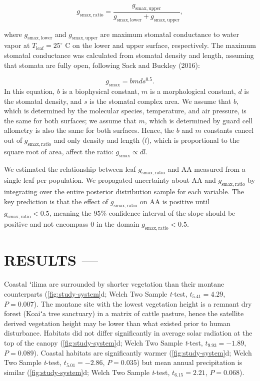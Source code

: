 \documentclass[
  letterpaper,
  DIV=11,
  numbers=noendperiod]{scrartcl}
\begin{document}
\[g_\mathrm{smax,ratio} = \frac{g_\mathrm{smax,upper}}{g_\mathrm{smax,lower} + g_\mathrm{smax,upper}},\]

where \(g_\mathrm{smax,lower}\) and \(g_\mathrm{smax,upper}\) are
maximum stomatal conductance to water vapor at
\(T_\mathrm{leaf} = 25 ^ \circ\) C on the lower and upper surface,
respectively. The maximum stomatal conductance was calculated from
stomatal density and length, assuming that stomata are fully open,
following Sack and Buckley (2016):

\[g_\mathrm{smax} = bmds^{0.5}.\] In this equation, \(b\) is a
biophysical constant, \(m\) is a morphological constant, \(d\) is the
stomatal density, and \(s\) is the stomatal complex area. We assume that
\(b\), which is determined by the molecular species, temperature, and
air pressure, is the same for both surfaces; we assume that \(m\), which
is determined by guard cell allometry is also the same for both
surfaces. Hence, the \(b\) and \(m\) constants cancel out of
\(g_\mathrm{smax,ratio}\) and only density and length (\(l\)), which is
proportional to the square root of area, affect the ratio:
\(g_\mathrm{smax} \propto dl\).

We estimated the relationship between leaf \(g_\mathrm{smax,ratio}\) and
\(\mathrm{AA}\) measured from a single leaf per population. We
propagated uncertainty about \(\mathrm{AA}\) and
\(g_\mathrm{smax,ratio}\) by integrating over the entire posterior
distribution sample for each variable. The key prediction is that the
effect of \(g_\mathrm{smax,ratio}\) on \(\mathrm{AA}\) is positive until
\(g_\mathrm{smax,ratio} < 0.5\), meaning the 95\% confidence interval of
the slope should be positive and not encompass 0 in the domain
\(g_\mathrm{smax,ratio} < 0.5\).

\hypertarget{results}{%
\section{RESULTS ---}\label{results}}

Coastal ʻilima are surrounded by shorter vegetation than their montane
counterparts (\autoref{fig:study-system}d; Welch Two Sample
\emph{t}-test, \(t_{5.41} = 4.29\), \(P = 0.007\)). The montane site
with the lowest vegetation height is a remnant dry forest (Koaiʻa tree
sanctuary) in a matrix of cattle pasture, hence the satellite derived
vegetation height may be lower than what existed prior to human
disturbance. Habitats did not differ significantly in average solar
radiation at the top of the canopy (\autoref{fig:study-system}d; Welch
Two Sample \emph{t}-test, \(t_{9.93} = -1.89\), \(P = 0.089\)). Coastal
habitats are significantly warmer (\autoref{fig:study-system}d; Welch
Two Sample \emph{t}-test, \(t_{5.01} = -2.86\), \(P = 0.035\)) but mean
annual precipitation is similar (\autoref{fig:study-system}d; Welch Two
Sample \emph{t}-test, \(t_{6.15} = 2.21\), \(P = 0.068\)).
\end{document}
